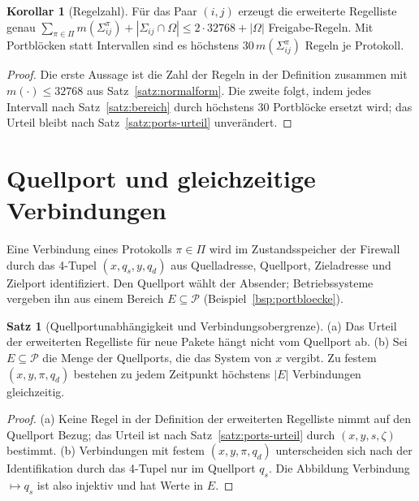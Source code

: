 \documentclass[a4paper,12pt, twoside]{report}
\theoremstyle{definition}
\newtheorem{satz}{Satz}
\newtheorem{korollar}{Korollar}
\begin{document}
\begin{korollar}[Regelzahl]
	Für das Paar $(i,j)$ erzeugt die erweiterte Regelliste genau $\sum_{\pi\in\Pi}m(\Sigma_{ij}^\pi)+|\Sigma_{ij}\cap\Omega|\le 2\cdot 32768+|\Omega|$ Freigabe-Regeln. Mit Portblöcken statt Intervallen sind es höchstens $30\,m(\Sigma_{ij}^\pi)$ Regeln je Protokoll.
\end{korollar}

\begin{proof}
	Die erste Aussage ist die Zahl der Regeln in der Definition zusammen mit $m(\cdot)\le 32768$ aus Satz~\ref{satz:normalform}. Die zweite folgt, indem jedes Intervall nach Satz~\ref{satz:bereich} durch höchstens $30$ Portblöcke ersetzt wird; das Urteil bleibt nach Satz~\ref{satz:ports-urteil} unverändert.
\end{proof}

\section{Quellport und gleichzeitige Verbindungen}

Eine Verbindung eines Protokolls $\pi\in\Pi$ wird im Zustandsspeicher der Firewall durch das 4-Tupel $(x,q_s,y,q_d)$ aus Quelladresse, Quellport, Zieladresse und Zielport identifiziert. Den Quellport wählt der Absender; Betriebssysteme vergeben ihn aus einem Bereich $E\subseteq\mathcal{P}$ (Beispiel~\ref{bsp:portbloecke}).

\begin{satz}[Quellportunabhängigkeit und Verbindungsobergrenze]
\label{satz:quellport}
	(a) Das Urteil der erweiterten Regelliste für neue Pakete hängt nicht vom Quellport ab. (b) Sei $E\subseteq\mathcal{P}$ die Menge der Quellports, die das System von $x$ vergibt. Zu festem $(x,y,\pi,q_d)$ bestehen zu jedem Zeitpunkt höchstens $|E|$ Verbindungen gleichzeitig.
\end{satz}

\begin{proof}
	(a) Keine Regel in der Definition der erweiterten Regelliste nimmt auf den Quellport Bezug; das Urteil ist nach Satz~\ref{satz:ports-urteil} durch $(x,y,s,\zeta)$ bestimmt. (b) Verbindungen mit festem $(x,y,\pi,q_d)$ unterscheiden sich nach der Identifikation durch das 4-Tupel nur im Quellport $q_s$. Die Abbildung \glqq Verbindung $\mapsto q_s$\grqq{} ist also injektiv und hat Werte in $E$.
\end{proof}
\end{document}
